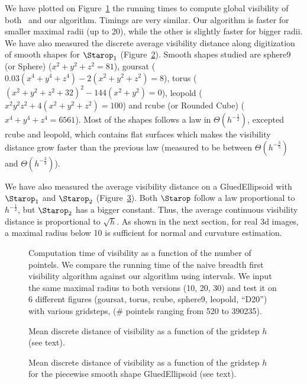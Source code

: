 We have plotted on
Figure~\ref{fig:meanvisibility-computationComplexity} the running
times to compute global visibility of both~\cite[Algorithm
3]{lachaud:2022-jmiv} and our algorithm. Timings are very similar. Our
algorithm is faster for smaller maximal radii (up to 20), while the
other is slightly faster for bigger radii. We have also measured the
discrete average visibility distance along digitization of smooth
shapes for $\Starop_1$ (Figure~\ref{fig:meanvisibility-gridstep}).
Smooth shapes studied are sphere9 (or Sphere) ($x^2+y^2+z^2=81$), goursat ($0.03\left(x^4+y^4+z^4\right)-2\left(x^2+y^2+z^2\right)=8$),
torus ($\left(x^2+y^2+z^2+32\right)^2-144\left(x^2+y^2\right)=0$), leopold ($x^2 y^2 z^2+4\left(x^2+y^2+z^2\right)=100$)
and rcube (or Rounded Cube) ($x^4+y^4+z^4=6561$). Most of the shapes follows
a law in $\Theta\left( h^{-\frac{1}{2}} \right)$, excepted rcube and leopold,
which contains flat surfaces which makes the visibility distance grow faster
than the previous law (measured to be between $\Theta\left( h^{-\frac{3}{5}} \right)$
and $\Theta\left( h^{-\frac{2}{3}} \right)$).

We have also measured the average visibility distance on a GluedEllipsoid with $\Starop_1$ and $\Starop_2$
(Figure~\ref{fig:meanvisibility-gridstep-piecewise}). Both $\Starop$ follow a law
proportional to $h^{-\frac{1}{2}}$, but $\Starop_2$ has a bigger constant.
Thus, the average continuous visibility distance is proportional
to $\sqrt{h}$. As shown in the next section, for real 3d images,
a maximal radius below 10 is sufficient for normal and curvature estimation.

\begin{figure}[t]
    \centering
    
    \caption{ \label{fig:meanvisibility-computationComplexity}Computation
    time of visibility as a function of the number of pointels. We
    compare the running time of the naive breadth first visibility
    algorithm against our algorithm using intervals. We input the same
    maximal radius to both versions (10, 20, 30) and test it on 6
    different figures (goursat, torus, rcube, sphere9, leopold,
        ``D20'') with various gridsteps, ($\#$ pointels ranging from 520
        to 390235).}
\end{figure}

\begin{figure}
    \centering
    
    \caption{\label{fig:meanvisibility-gridstep} Mean discrete distance of visibility as a function of the gridstep $h$ (see text).}
\end{figure}

\begin{figure}
    \centering
    
    \caption{\label{fig:meanvisibility-gridstep-piecewise} Mean discrete distance of visibility as a function of the gridstep $h$ for the piecewise smooth shape GluedEllipsoid (see text).}
\end{figure}
